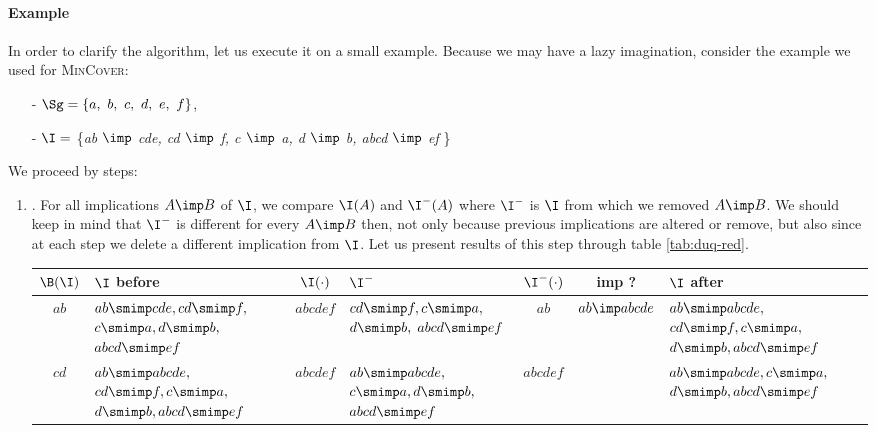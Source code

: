 \paragraph{Example} In order to clarify the algorithm, let us execute it on a
small example. Because we may have a lazy imagination, consider the example we used for \textsc{MinCover}:
\begin{itemize}
	\item[-] $\Sg = \{a, \ b, \ c, \ d, \ e, \ f \}$,
	\item[-] $\I =$ \{\textit{ab $\imp$ cde, cd $\imp$ f, c $\imp$ a, d $\imp$ b, 
		abcd $\imp$ ef} \} 
\end{itemize}
We proceed by steps:
\begin{enumerate}
	\item {}. For all implications $A \imp B$ of $\I$,
	we compare $\I(A)$ and $\I^{-}(A)$ where $\I^{-}$ is $\I$ from which we removed $A \imp B$. We should keep in mind that $\I^{-}$ is different 
	for every $A \imp B$ then, not only because previous implications are altered or remove, but also since at each step we delete a different implication from $\I$. Let us present results of this step through table \ref{tab:duq-red}.
	
\begin{table}[ht]
	\begin{tabular}{| c || p{2.7cm} | c | p{2.5cm} | c | c | p{2.7cm} | }
	\hline \rowcolor{clouds}
	$\B(\I)$ & $\I$ before & $\I(\cdot)$ & $\I^{-}$ & $\I^{-}(\cdot)$ & imp ? & $\I$ after \\ \hline
	
	$ab$ & $ab \smimp cde, cd \smimp f,$ \newline $c \smimp a, d \smimp b,$ \newline  $abcd \smimp ef$ & $abcdef$ & $cd \smimp f, c \smimp a,$ \newline $d \smimp b,$ \newline $abcd \smimp ef$ & $ab$ & $ab \imp abcde$ & $ab \smimp abcde,$ \newline $cd \smimp f, c \smimp a,$ \newline $d \smimp b, abcd \smimp ef$ \\	\hline
	 
	$cd$ & $ab \smimp abcde,$ \newline $cd \smimp f, c \smimp a,$ \newline $d \smimp b, abcd \smimp ef$ &	$abcdef$ & $ab \smimp abcde,$ \newline $c \smimp a, d \smimp b,$ \newline $abcd \smimp ef$ & $abcdef$ & \aliemp{removed} & $ab \smimp abcde, c \smimp a,$ \newline $d \smimp b, abcd \smimp ef$ \\ \hline
	

\end{tabular}
\end{table}
\end{enumerate}
